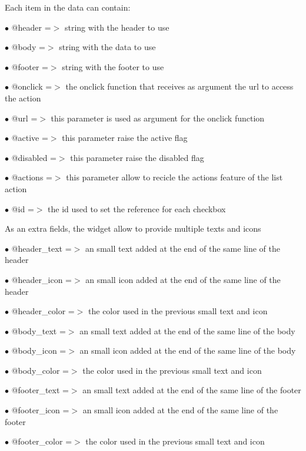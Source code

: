 \documentclass[a4paper]{article}
\begin{document}
Each item in the data can contain:

\begin{compactitem}
\item[\color{myblue}$\bullet$] @header   =$>$ string with the header to use
\item[\color{myblue}$\bullet$] @body     =$>$ string with the data to use
\item[\color{myblue}$\bullet$] @footer   =$>$ string with the footer to use
\item[\color{myblue}$\bullet$] @onclick  =$>$ the onclick function that receives as argument the url to access the action
\item[\color{myblue}$\bullet$] @url      =$>$ this parameter is used as argument for the onclick function
\item[\color{myblue}$\bullet$] @active   =$>$ this parameter raise the active flag
\item[\color{myblue}$\bullet$] @disabled =$>$ this parameter raise the disabled flag
\item[\color{myblue}$\bullet$] @actions  =$>$ this parameter allow to recicle the actions feature of the list action
\item[\color{myblue}$\bullet$] @id       =$>$ the id used to set the reference for each checkbox
\end{compactitem}

As an extra fields, the widget allow to provide multiple texts and icons

\begin{compactitem}
\item[\color{myblue}$\bullet$] @header\_text  =$>$ an small text added at the end of the same line of the header
\item[\color{myblue}$\bullet$] @header\_icon  =$>$ an small icon added at the end of the same line of the header
\item[\color{myblue}$\bullet$] @header\_color =$>$ the color used in the previous small text and icon
\item[\color{myblue}$\bullet$] @body\_text    =$>$ an small text added at the end of the same line of the body
\item[\color{myblue}$\bullet$] @body\_icon    =$>$ an small icon added at the end of the same line of the body
\item[\color{myblue}$\bullet$] @body\_color   =$>$ the color used in the previous small text and icon
\item[\color{myblue}$\bullet$] @footer\_text  =$>$ an small text added at the end of the same line of the footer
\item[\color{myblue}$\bullet$] @footer\_icon  =$>$ an small icon added at the end of the same line of the footer
\item[\color{myblue}$\bullet$] @footer\_color =$>$ the color used in the previous small text and icon
\end{compactitem}
\end{document}
